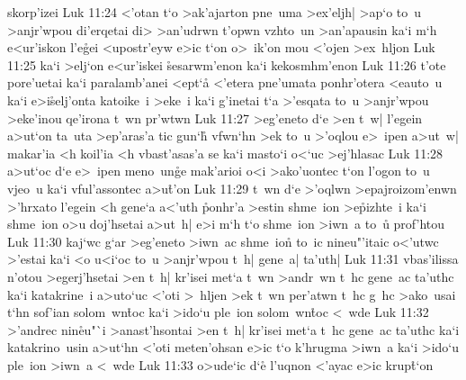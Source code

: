 skorp'izei\bibvsend
\vs Luk 11:24
<'otan
t`o
>ak'ajarton
pne~uma
>ex'eljh|
>ap`o
to~u
>anjr'wpou
di'erqetai
di>
>an'udrwn
t'opwn
vzhto~un
>an'apausin
ka`i
m`h
e<ur'iskon
l'e\r{g}ei
<upostr'eyw
e>ic
t`on
o>~ik'on
mou
<'ojen
>ex~hljon\bibvsend
\vs Luk 11:25
ka`i
>elj`on
e<ur'iskei
\r{s}esarwm'enon
ka`i
kekosmhm'enon\bibvsend
\vs Luk 11:26
t'ote
pore'uetai
ka`i
paralamb'anei
<ept`a\r{}
<'etera
pne'umata
ponhr'otera
<eauto~u
ka`i
e>i\r{s}elj'onta
katoike~i
>eke~i
ka`i
g'inetai
t`a
>'esqata
to~u
>anjr'wpou
>eke'inou
qe'irona
t~wn
pr'wtwn\bibvsend
\vs Luk 11:27
>eg'eneto
d`e
>en
t~w|
l'egein
a>ut`on
ta~uta
>ep'aras'a
tic
gun`h\r{}
vfwn`hn
>ek
to~u
>'oqlou
e>~ipen
a>ut~w|
makar'ia
<h
koil'ia
<h
vbast'asas'a
se
ka`i
masto`i
o<`uc
>ej'hlasac\bibvsend
\vs Luk 11:28
a>ut`oc
d`e
e>~ipen
meno~un\r{g}e
mak'arioi
o<i
>ako'uontec
t`on
l'ogon
to~u
vjeo~u
ka`i
vful'assontec
a>u\r{t}'on\bibvsend
{}
\vs Luk 11:29
t~wn
d`e
>'oqlwn
>epajroizom'enwn
>'hrxato
l'egein
<h
gene`a
a<'uth
\r{p}onhr'a
>estin
shme~ion
>e\r{p}izhte~i
ka`i
shme~ion
o>u
doj'hsetai
a>ut~h|
e>i
m`h
t`o
shme~ion
>iwn~a
to~u\r{}
prof'htou\bibvsend
\vs Luk 11:30
kaj`wc
g`ar
>eg'eneto
>iwn~ac
shme~ion\r{}
to~ic
nineu"'itaic
o<'utwc
>'estai
ka`i
<o
u<i`oc
to~u
>anjr'wpou
t~h|
gene~a|
ta'uth|\bibvsend
\vs Luk 11:31
vbas'ilissa
n'otou
>egerj'hsetai
>en
t~h|
kr'isei
met`a
t~wn
>andr~wn
t~hc
gene~ac
ta'uthc
ka`i
katakrine~i
a>uto`uc
<'oti
>~hljen
>ek
t~wn
per'atwn
t~hc
g~hc
>ako~usai
t`hn
sof'ian
solom~wn\r{t}oc
ka`i
>ido`u
ple~ion
solom~wn\r{t}oc
<~wde\bibvsend
\vs Luk 11:32
>'andrec
nin\r{e}u"`i
>anast'hsontai
>en
t~h|
kr'isei
met`a
t~hc
gene~ac
ta'uthc
ka`i
katakrino~usin
a>ut`hn
<'oti
meten'ohsan
e>ic
t`o
k'hrugma
>iwn~a
ka`i
>ido`u
ple~ion
>iwn~a
<~wde\bibvsend
\vs Luk 11:33
o>ude`ic
d`e\r{}
l'uqnon
<'ayac
e>ic
krup\r{t}`on
